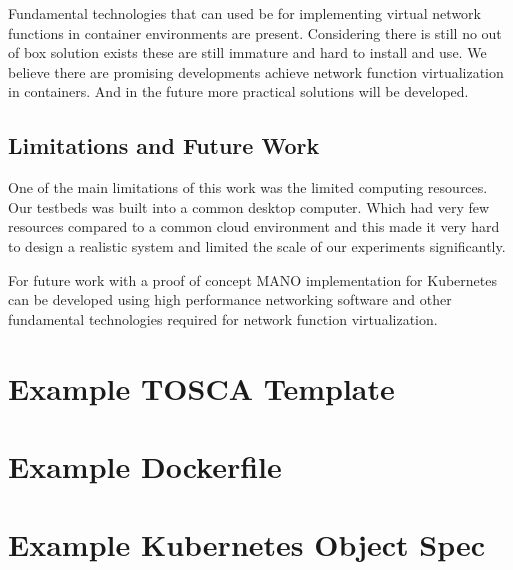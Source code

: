 \documentclass[12pt,oneandhalf,chaparabic,ceng,ms,eng,oneside,pntc]{gsufbe}
\begin{document}
Fundamental technologies that can used be for implementing virtual network functions in
container environments are present.  Considering there is still no out of box solution exists these are
still immature and hard to install and use.  We believe there are promising developments achieve network
function virtualization in containers.  And in the future more practical solutions will be developed.

\section{Limitations and Future Work}
One of the main limitations of this work was the limited computing resources.  Our testbeds was 
built into a common desktop computer.  Which had very few resources compared to a common cloud
environment and this made it very hard to design a realistic system and limited the scale of our
experiments significantly.

For future work with a proof of concept MANO implementation for Kubernetes can be developed using high
performance networking software and other fundamental technologies required for network function
virtualization.




\appendix
\lstset{%
   breaklines=true,
}
\thispagestyle{empty}
\chapter[]{Example TOSCA Template}
\thispagestyle{empty}
\label{appendix:tosca}

\newpage


\chapter[]{Example Dockerfile}
\thispagestyle{empty}
\label{appendix:docker}


\chapter[]{Example Kubernetes Object Spec}
\thispagestyle{empty}
\label{appendix:k8spec}

\newpage




\thispagestyle{empty}
\end{document}
